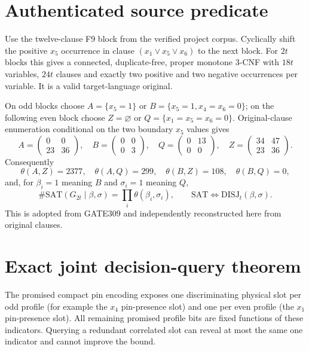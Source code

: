\documentclass[11pt]{article}
\begin{document}
\section{Authenticated source predicate}
Use the twelve-clause F9 block from the verified project corpus.  Cyclically shift
the positive $x_5$ occurrence in clause $(x_1\vee x_5\vee x_6)$ to the next block.
For $2t$ blocks this gives a connected, duplicate-free, proper monotone 3-CNF with
$18t$ variables, $24t$ clauses and exactly two positive and two negative occurrences
per variable.  It is a valid target-language original.

On odd blocks choose $A=\{x_5=1\}$ or
$B=\{x_5=1,x_4=x_6=0\}$; on the following even block choose
$Z=\varnothing$ or $Q=\{x_1=x_5=x_6=0\}$.  Original-clause enumeration conditional
on the two boundary $x_5$ values gives
\[
A=\begin{pmatrix}0&0\\23&36\end{pmatrix},\quad
B=\begin{pmatrix}0&0\\0&3\end{pmatrix},\quad
Q=\begin{pmatrix}0&13\\0&0\end{pmatrix},\quad
Z=\begin{pmatrix}34&47\\23&36\end{pmatrix}.
\]
Consequently
\[
\theta(A,Z)=2377,\quad\theta(A,Q)=299,\quad
\theta(B,Z)=108,\quad\theta(B,Q)=0,
\]
and, for $\beta_i=1$ meaning $B$ and $\sigma_i=1$ meaning $Q$,
\[
\#\mathrm{SAT}(G_{2t}\mid\beta,\sigma)
=\prod_i\theta(\beta_i,\sigma_i),\qquad
\mathrm{SAT}\iff\mathrm{DISJ}_t(\beta,\sigma).
\]
This is adopted from GATE309 and independently reconstructed here from original clauses.

\section{Exact joint decision-query theorem}
The promised compact pin encoding exposes one discriminating physical slot per
odd profile (for example the $x_4$ pin-presence slot) and one per even profile
(the $x_1$ pin-presence slot).  All remaining promised profile bits are fixed
functions of these indicators.  Querying a redundant correlated slot can reveal at
most the same one indicator and cannot improve the bound.
\end{document}
